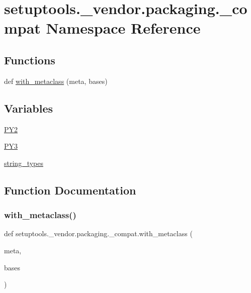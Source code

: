 \hypertarget{namespacesetuptools_1_1__vendor_1_1packaging_1_1__compat}{}\section{setuptools.\+\_\+vendor.\+packaging.\+\_\+compat Namespace Reference}
\label{namespacesetuptools_1_1__vendor_1_1packaging_1_1__compat}
\subsection*{Functions}
\begin{DoxyCompactItemize}
\item 
def \hyperlink{namespacesetuptools_1_1__vendor_1_1packaging_1_1__compat_a6f34cbae1a8cd62fa4dba1b0b0f430ba}{with\+\_\+metaclass} (meta, bases)
\end{DoxyCompactItemize}
\subsection*{Variables}
\begin{DoxyCompactItemize}
\item 
\hyperlink{namespacesetuptools_1_1__vendor_1_1packaging_1_1__compat_a7a5cc5637ae1f78e94cafaa58b028406}{P\+Y2}
\item 
\hyperlink{namespacesetuptools_1_1__vendor_1_1packaging_1_1__compat_a4c7cf0b6542569ca098753f3047decbf}{P\+Y3}
\item 
\hyperlink{namespacesetuptools_1_1__vendor_1_1packaging_1_1__compat_a778de23270f127e8d20921b8ea7e1cc2}{string\+\_\+types}
\end{DoxyCompactItemize}


\subsection{Function Documentation}
\mbox{\label{namespacesetuptools_1_1__vendor_1_1packaging_1_1__compat_a6f34cbae1a8cd62fa4dba1b0b0f430ba}} 
\subsubsection{\texorpdfstring{with\+\_\+metaclass()}{with\_metaclass()}}
{\footnotesize\ttfamily def setuptools.\+\_\+vendor.\+packaging.\+\_\+compat.\+with\+\_\+metaclass (\begin{DoxyParamCaption}\item[{}]{meta,  }\item[{}]{bases }\end{DoxyParamCaption})}

